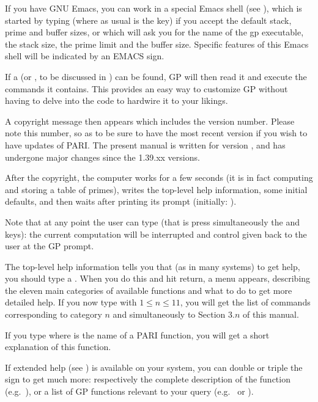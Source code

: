 \emacs If you have GNU Emacs, you can work in a special Emacs shell (see
), which is started by typing  (where as
usual  is the  key) if you accept the default stack, prime
and buffer sizes, or  which will ask you for the name of the
gp executable, the stack size, the prime limit and the buffer size. Specific
features of this Emacs shell will be indicated by an EMACS sign.\smallskip

If a  (or , to be discussed in
) can be found, GP will then read it and execute the commands
it contains. This provides an easy way to customize GP without having to
delve into the code to hardwire it to your likings.

A copyright message then appears which includes the version number. Please
note this number, so as to be sure to have the most recent version if you
wish to have updates of PARI. The present manual is written for version
\vers, and has undergone major changes since the 1.39.xx versions.

After the copyright, the computer works for a few seconds (it is in fact
computing and storing a table of primes), writes the top-level help
information, some initial defaults, and then waits after printing its prompt
(initially: ).

Note that at any point the user can type  (that is press
simultaneously the  and  keys): the current
computation will be interrupted and control given back to the user at the GP
prompt.

The top-level help information tells you that (as in many systems) to get
help, you should type a . When you do this and hit return, a menu
appears, describing the eleven main categories of available functions and
what to do to get more detailed help. If you now type  with $1\le
n\le11$, you will get the list of commands corresponding to category $n$
and simultaneously to Section $3.n$ of this manual.

If you type  where  is the
name of a PARI function, you will get a short explanation of this
function.

\unix If extended help (see ) is available on your
system, you can double or triple the  sign to get much more:
respectively the complete description of the function (e.g.~),
or a list of GP functions relevant to your query (e.g.~  or ).

